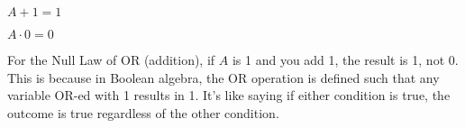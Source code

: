\begin{ColorThemedBox}[1][2][title=Itempotent Law]\relax
	\begin{Items}
		 $ A + 1 = 1 $

		 $ A \cdot 0 = 0 $

		 For the Null Law of OR (addition), if $A$ is 1 and you add 1, the result is 1, not 0.
		This is because in Boolean algebra, the OR operation is defined such that any variable OR-ed with 1 results in 1.
		It’s like saying if either condition is true, the outcome is true regardless of the other condition.\smallskip
	\end{Items}
\end{ColorThemedBox}
\smallskip\\
